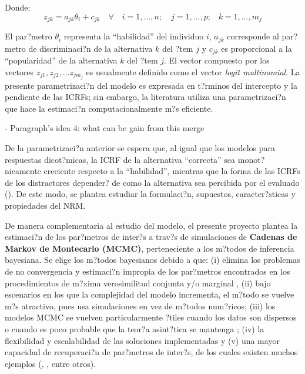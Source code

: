 Donde:
\begin{equation*}
z_{jk} = a_{jk}\theta_i + c_{jk} \quad \forall \quad i = 1, \dots, n; \quad j = 1, \dots, p \text{;} \quad k = 1, \dots, m_j
\end{equation*}

El par?metro $\theta_i$ representa la ``habilidad'' del individuo $i$, $a_{jk}$ corresponde al par?metro de discriminaci?n de la alternativa $k$ del ?tem $j$ y $c_{jk}$ es proporcional a la ``popularidad'' de la alternativa $k$ del ?tem $j$. El vector compuesto por los vectores $z_{j1}, z_{j2}, \dots z_{j m_j}$ es usualmente definido como el vector \textit{logit multinomial}. La presente parametrizaci?n del modelo es expresada en t?rminos del intercepto y la pendiente de las ICRFs; sin embargo, la literatura utiliza una parametrizaci?n que hace la estimaci?n computacionalmente m?s eficiente.

- Paragraph's idea 4: what can be gain from this merge

De la parametrizaci?n anterior se espera que, al igual que los modelos para respuestas dicot?micas, la ICRF de la alternativa ``correcta'' sea monot?nicamente creciente respecto a la ``habilidad'', mientras que la forma de las ICRFs de los distractores depender? de como la alternativa sea percibida por el evaluado (\citealp{Ham_Swam1991}). De este modo, se plantea estudiar la formulaci?n, supuestos, caracter?sticas y propiedades del NRM.

De manera complementaria al estudio del modelo, el presente proyecto plantea la estimaci?n de los par?metros de inter?s a trav?s de simulaciones de \textbf{Cadenas de Markov de Montecarlo (MCMC)}, perteneciente a los m?todos de inferencia bayesiana. Se elige los m?todos bayesianos debido a que: (i) elimina los problemas de no convergencia y estimaci?n impropia de los par?metros encontrados en los procedimientos de m?xima verosimilitud conjunta y/o marginal \citep{Ham_Swam_Rog1991}, (ii) bajo escenarios en los que la complejidad del modelo incrementa, el m?todo se vuelve m?s atractivo, pues usa simulaciones en vez de m?todos num?ricos; (iii) los modelos MCMC se vuelven particularmente ?tiles cuando los datos son dispersos o cuando es poco probable que la teor?a asint?tica se mantenga \citep{Fox2010}; (iv) la flexibilidad y escalabilidad de las soluciones implementadas y (v) una mayor capacidad de recuperaci?n de par?metros de inter?s, de los cuales existen muchos ejemplos (\citealp{Hsi_Proc_Hou_Teo2010}, \citealp{Tarazona2013}, entre otros).


